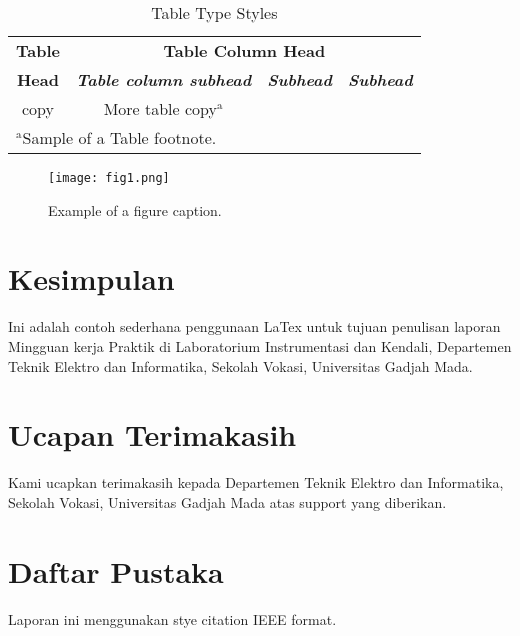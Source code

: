 \documentclass{article}
\begin{document}
	\begin{table}[htbp]
		\caption{Table Type Styles}
		\begin{center}
			\begin{tabular}{|c|c|c|c|}
				\hline
				\textbf{Table}&\multicolumn{3}{|c|}{\textbf{Table Column Head}} \\
				\cline{2-4} 
				\textbf{Head} & \textbf{\textit{Table column subhead}}& \textbf{\textit{Subhead}}& \textbf{\textit{Subhead}} \\
				\hline
				copy& More table copy$^{\mathrm{a}}$& &  \\
				\hline
				\multicolumn{4}{l}{$^{\mathrm{a}}$Sample of a Table footnote.}
			\end{tabular}
			\label{tab1}
		\end{center}
	\end{table}
	
	\begin{figure}[htbp]
		\centerline{\texttt{[image: fig1.png]}}
		\caption{Example of a figure caption.}
		\label{fig}
	\end{figure}
	
		\section{Kesimpulan}
		Ini adalah contoh sederhana penggunaan LaTex untuk tujuan penulisan laporan Mingguan kerja Praktik di Laboratorium Instrumentasi dan Kendali, Departemen Teknik Elektro dan Informatika, Sekolah Vokasi, Universitas Gadjah Mada.
	
\section*{Ucapan Terimakasih}
Kami ucapkan terimakasih kepada Departemen Teknik Elektro dan Informatika, Sekolah Vokasi, Universitas Gadjah Mada atas support yang diberikan.

\section*{Daftar Pustaka}
Laporan ini menggunakan stye citation IEEE format.
\end{document}
